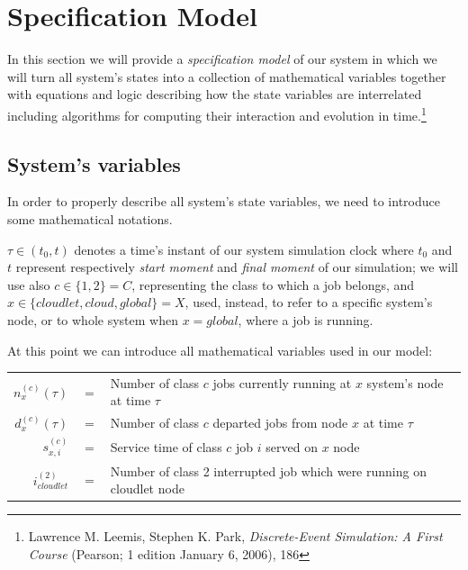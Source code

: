 \documentclass[10pt,a4paper]{article}
\begin{document}
\clearpage
\newpage
\section{Specification  Model}

In this section we will provide a \textit{specification model} of our system in which we will turn all system's states into a collection of mathematical variables together with equations and logic describing how the state variables are interrelated including algorithms for computing their interaction and evolution in time.\footnote{Lawrence M. Leemis, Stephen K. Park, \textit{Discrete-Event Simulation: A First Course} (Pearson; 1 edition January 6, 2006), 186}

\subsection{System's variables}

In order to properly describe all system's state variables, we need to introduce some mathematical notations.

$\tau \in (t_0, t)$ denotes a time's instant of our system simulation clock where $t_0$ and $t$ represent respectively \textit{start moment} and \textit{final moment} of our simulation; we will use also $c \in \lbrace 1,2 \rbrace = C$, representing the class to which a job belongs, and $x \in \lbrace cloudlet,cloud,global \rbrace = X$, used, instead, to refer to a specific system's node, or to whole system when $x = global$, where a job is running.

At this point we can introduce all mathematical variables used in our model:

\begin{table}[h!]
    \centering
    \small
    \begin{tabular}{rcl}
       
      $n_x^{(c)}(\tau)$ & $ = $ & Number of class $c$ jobs currently running at $x$ system's node at time $\tau$ \\
      $d_x^{(c)}(\tau)$ & $ = $ & Number of class $c$ departed jobs from node $x$ at time $\tau$ \\
      $s_{x,i}^{(c)}$ & $ = $ & Service time of class $c$ job $i$ served on $x$ node   \\
      $i_{cloudlet}^{(2)}$ & $ = $ & Number of class 2 interrupted job which were running on cloudlet node\\
          
    \end{tabular}
\end{table}
\end{document}
